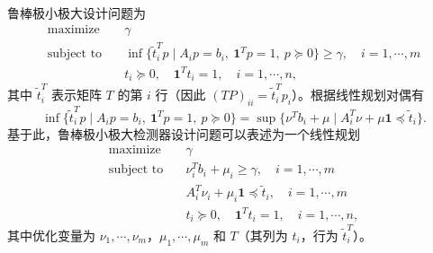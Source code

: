 \documentclass[UTF8, 12pt, fontset=fandol, oneside]{ctexart}
\begin{document}
鲁棒极小极大设计问题为
\[
\begin{aligned}
\text{maximize}\quad & \gamma\\
\text{subject to}\quad & \inf\{\tilde{t}_i^Tp\mid A_ip=b_i,\ \mathbf{1}^Tp=1,\ p\succeq 0\}\geq \gamma,\quad i=1,\cdots,m\\
& t_i\succeq 0,\quad \mathbf{1}^Tt_i=1,\quad i=1,\cdots,n,
\end{aligned}
\]
其中 $\tilde{t}_i^T$ 表示矩阵 $T$ 的第 $i$ 行（因此 $(TP)_{ii}=\tilde{t}_i^Tp_i$）。根据线性规划对偶有
\[
\inf\{\tilde{t}_i^Tp\mid A_ip=b_i,\ \mathbf{1}^Tp=1,\ p\succeq 0\}
=\sup\{\nu^Tb_i+\mu\mid A_i^T\nu+\mu\mathbf{1}\preceq \tilde{t}_i\}.
\]
基于此，鲁棒极小极大检测器设计问题可以表述为一个线性规划
\[
\begin{aligned}
\text{maximize}\quad & \gamma\\
\text{subject to}\quad & \nu_i^Tb_i+\mu_i\geq \gamma,\quad i=1,\cdots,m\\
& A_i^T\nu_i+\mu_i\mathbf{1}\preceq \tilde{t}_i,\quad i=1,\cdots,m\\
& t_i\succeq 0,\quad \mathbf{1}^Tt_i=1,\quad i=1,\cdots,n,
\end{aligned}
\]
其中优化变量为 $\nu_1,\cdots,\nu_m$，$\mu_1,\cdots,\mu_m$ 和 $T$（其列为 $t_i$，行为 $\tilde{t}_i^T$）。
\end{document}
